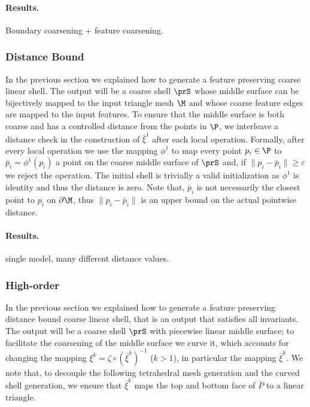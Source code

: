 \paragraph{Results.} 
Boundary coarsening + feature coarsening.

\subsubsection{Distance Bound}\label{sec:distance}

In the previous section we explained how to generate a feature preserving coarse linear shell. The output will be a coarse shell $\prS$ whose middle surface can be bijectively mapped to the input triangle mesh $\M$ and whose coarse feature edges are mapped to the input features. To ensure that the middle surface is both coarse and has a controlled distance from the points in $\P$, we interleave a distance check in the construction of $\bar\xi^1$ after each local operation. Formally, after every local operation we use the mapping $\phi^1$ to map every point $p_i\in\P$ to $\bar p_i = \phi^1(p_i)$ a point on the coarse middle surface of $\prS$ and, if $\|p_i-\bar p_i\| \geq \varepsilon$ we reject the operation. The initial shell is trivially a valid initialization as $\phi^1$ is identity and thus the distance is zero. Note that, $\bar p_i$ is not necessarily the closest point to $p_i$ on $\partial\M$, thus $\|p_i-\bar p_i\|$ is an upper bound on the actual pointwise distance.   


\paragraph{Results.} 
single model, many different distance values.


\subsubsection{High-order}\label{sec:high-order}
In the previous section we explained how to generate a feature preserving distance bound coarse linear shell, that is an output that satisfies all invariants. The output will be a coarse shell $\prS$ with piecewise linear middle surface; to facilitate the coarsening of the middle surface we curve it, which accounts for changing the mapping $\xi^k = \zeta\circ (\bar\xi^k)^{-1}$ ($k > 1$), in particular the mapping $\bar\xi^k$. We note that, to decouple the following tetrahedral mesh generation and the curved shell generation, we ensure that $\bar\xi^k$ maps the top and bottom face of $\bar P$ to a linear triangle.

